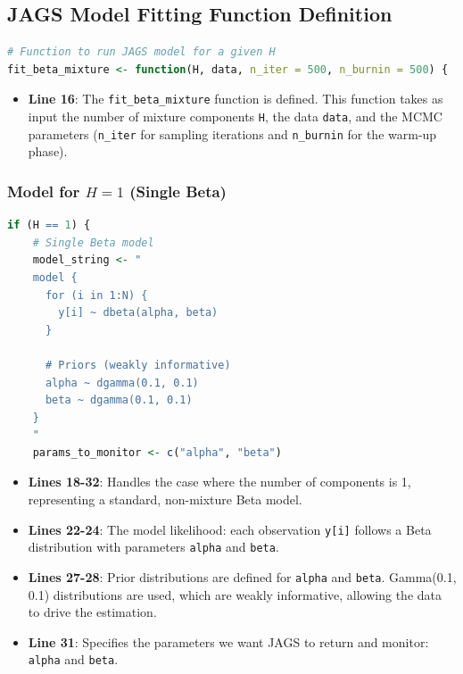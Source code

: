 \documentclass{article}
\begin{document}
\subsection{JAGS Model Fitting Function Definition}
\begin{lstlisting}[language=R, firstnumber=15]
# Function to run JAGS model for a given H
fit_beta_mixture <- function(H, data, n_iter = 500, n_burnin = 500) {
\end{lstlisting}
\begin{itemize}
  \item \textbf{Line 16}: The \texttt{fit\_beta\_mixture} function is defined. This function takes as input the number of mixture components \texttt{H}, the data \texttt{data}, and the MCMC parameters (\texttt{n\_iter} for sampling iterations and \texttt{n\_burnin} for the warm-up phase).
\end{itemize}

\subsubsection{\texorpdfstring{Model for $H = 1$ (Single Beta)}{}}
\begin{lstlisting}[language=R, firstnumber=18]
  if (H == 1) {
    # Single Beta model
    model_string <- "
    model {
      for (i in 1:N) {
        y[i] ~ dbeta(alpha, beta)
      }
      
      # Priors (weakly informative)
      alpha ~ dgamma(0.1, 0.1)
      beta ~ dgamma(0.1, 0.1)
    }
    "
    params_to_monitor <- c("alpha", "beta")
\end{lstlisting}
\begin{itemize}
  \item \textbf{Lines 18-32}: Handles the case where the number of components is 1, representing a standard, non-mixture Beta model.
  \item \textbf{Lines 22-24}: The model likelihood: each observation \texttt{y[i]} follows a Beta distribution with parameters \texttt{alpha} and \texttt{beta}.
  \item \textbf{Lines 27-28}: Prior distributions are defined for \texttt{alpha} and \texttt{beta}. Gamma(0.1, 0.1) distributions are used, which are weakly informative, allowing the data to drive the estimation.
  \item \textbf{Line 31}: Specifies the parameters we want JAGS to return and monitor: \texttt{alpha} and \texttt{beta}.
\end{itemize}
\end{document}
